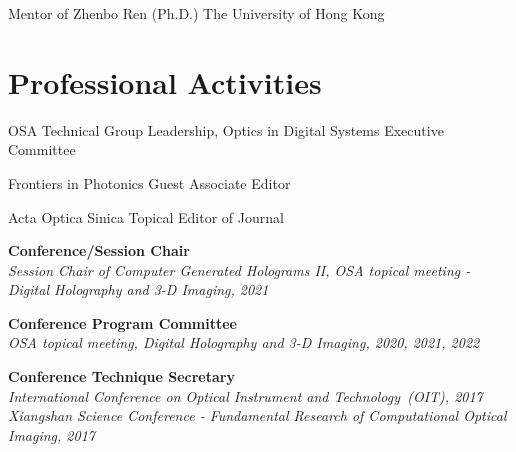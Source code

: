 \documentclass[10pt,a4paper]{moderncv}
\begin{document}
{Mentor of Zhenbo Ren (Ph.D.)}
{The University of Hong Kong}
{}
{}
{}

\section{Professional Activities}
	{OSA Technical Group Leadership, Optics in Digital Systems}
	{Executive Committee}
	{}{\textit{}}{}
	
	{Frontiers in Photonics}
	{Guest Associate Editor}
	{}{\textit{}}{}
	
	{Acta Optica Sinica}
	{Topical Editor of Journal}
	{}{\textit{}}{}
	
    \textbf{Conference/Session Chair} \\
	{\em 
	Session Chair of Computer Generated Holograms II, OSA topical meeting - Digital Holography and 3-D Imaging, \hfill 2021\\
	}
	\vspace{-9pt} 

	\textbf{Conference Program Committee} \\
	{\em 
	OSA topical meeting, Digital Holography and 3-D Imaging, \hfill 2020, 2021, 2022\\
	}
	\vspace{-9pt} 
	
	\textbf{Conference Technique Secretary} \\
	{\em 
	International Conference on Optical Instrument and Technology~(OIT), \hfill 2017\\ 
	Xiangshan Science Conference - Fundamental Research of Computational Optical Imaging, \hfill 2017\\
	}
	\vspace{-6pt}
	
\end{document}
